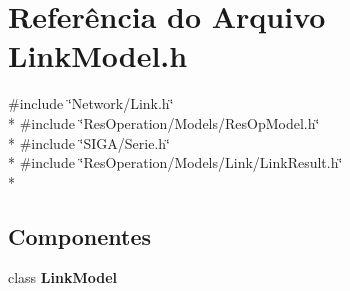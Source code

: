 \section{Referência do Arquivo Link\+Model.\+h}
\label{_link_model_8h}
{\ttfamily \#include \char`\"{}Network/\+Link.\+h\char`\"{}}\\*
{\ttfamily \#include \char`\"{}Res\+Operation/\+Models/\+Res\+Op\+Model.\+h\char`\"{}}\\*
{\ttfamily \#include \char`\"{}S\+I\+G\+A/\+Serie.\+h\char`\"{}}\\*
{\ttfamily \#include \char`\"{}Res\+Operation/\+Models/\+Link/\+Link\+Result.\+h\char`\"{}}\\*
\subsection*{Componentes}
\begin{DoxyCompactItemize}
\item 
class {\bf Link\+Model}
\end{DoxyCompactItemize}
